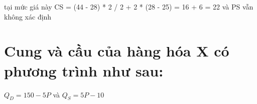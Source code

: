 \begin{enumerate}[a.]



    tại mức giá này CS = (44 - 28) * 2 / 2 + 2 * (28 - 25) = 16 + 6 = 22 và PS vẫn không xác định

\end{enumerate}

\section{Cung và cầu của hàng hóa X có phương trình như sau:}

$Q_D = 150 - 5P$ và $Q_S = 5P - 10$

